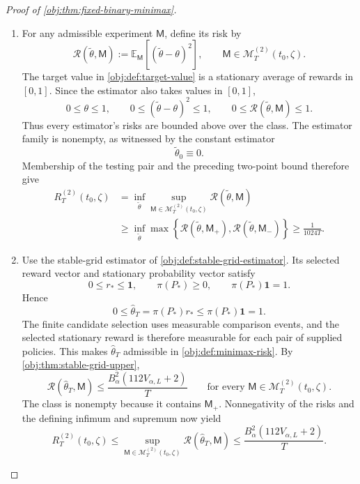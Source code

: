 \documentclass[11pt]{article}
\begin{document}
\begin{proof}[Proof of \cref{obj:thm:fixed-binary-minimax}]
\begin{enumerate}
\item For any admissible experiment \(\mathsf M\), define its risk by
\[
\mathcal R(\widetilde\theta,\mathsf M)
:=
\mathbb E_{\mathsf M}[(\widetilde\theta-\theta)^2],
\qquad
\mathsf M\in\mathcal M_T^{(2)}(t_0,\zeta).
\]
The target value in \cref{obj:def:target-value} is a stationary average of rewards in \([0,1]\). Since the estimator also takes values in \([0,1]\),
\[
0\leq\theta\leq1,
\qquad
0\leq(\widetilde\theta-\theta)^2\leq1,
\qquad
0\leq\mathcal R(\widetilde\theta,\mathsf M)\leq1.
\]
Thus every estimator's risks are bounded above over the class. The estimator family is nonempty, as witnessed by the constant estimator
\[
\widetilde\theta_0\equiv0.
\]
Membership of the testing pair and the preceding two-point bound therefore give
\[
\begin{aligned}
R_T^{(2)}(t_0,\zeta)
&=\inf_{\widetilde\theta}
\sup_{\mathsf M\in\mathcal M_T^{(2)}(t_0,\zeta)}
\mathcal R(\widetilde\theta,\mathsf M)\\
&\geq
\inf_{\widetilde\theta}
\max\left\{
\mathcal R(\widetilde\theta,\mathsf M_+),
\mathcal R(\widetilde\theta,\mathsf M_-)
\right\}
\geq\frac1{1024T}.
\end{aligned}
\]

\item Use the stable-grid estimator of
\cref{obj:def:stable-grid-estimator}. Its selected reward vector and stationary probability vector satisfy
\[
0\leq r_*\leq\mathbf1,
\qquad
\pi(P_*)\geq0,
\qquad
\pi(P_*)\mathbf1=1.
\]
Hence
\[
0\leq\widehat\theta_T
=\pi(P_*)r_*
\leq\pi(P_*)\mathbf1=1.
\]
The finite candidate selection uses measurable comparison events, and the selected stationary reward is therefore measurable for each pair of supplied policies. This makes \(\widehat\theta_T\) admissible in
\cref{obj:def:minimax-risk}. By \cref{obj:thm:stable-grid-upper},
\[
\mathcal R(\widehat\theta_T,\mathsf M)
\leq\frac{B_\alpha^2(112V_{\alpha,L}+2)}{T}
\qquad
\text{for every }\mathsf M\in\mathcal M_T^{(2)}(t_0,\zeta).
\]
The class is nonempty because it contains \(\mathsf M_+\). Nonnegativity of the risks and the defining infimum and supremum now yield
\[
R_T^{(2)}(t_0,\zeta)
\leq
\sup_{\mathsf M\in\mathcal M_T^{(2)}(t_0,\zeta)}
\mathcal R(\widehat\theta_T,\mathsf M)
\leq\frac{B_\alpha^2(112V_{\alpha,L}+2)}{T}.
\]


\end{enumerate}
\end{proof}
\end{document}
